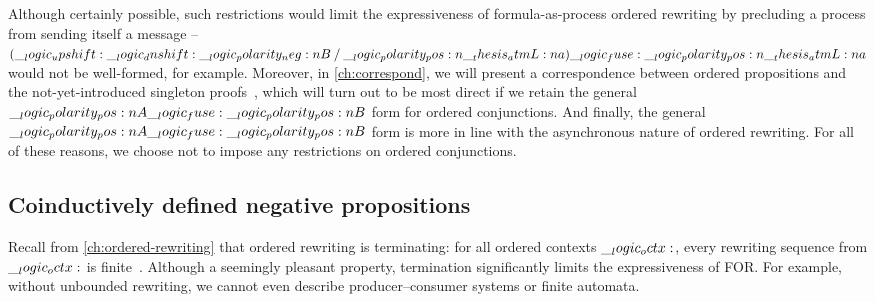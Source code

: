 Although certainly possible, such restrictions would limit the expressiveness of formula-as-process ordered rewriting by precluding a process from sending itself a message -- $(\__logic_upshift: \__logic_dnshift: \__logic_polarity_neg:n {B} \mathbin { / } \__logic_polarity_pos:n {\__thesis_atmL:n {a}}) \__logic_fuse: \__logic_polarity_pos:n {\__thesis_atmL:n {a}}$ would not be well-formed, for example.
Moreover, in \cref{ch:correspond}, we will present a correspondence between ordered propositions and the not-yet-introduced singleton proofs~, which will turn out to be most direct if we retain the general $\__logic_polarity_pos:n {A} \__logic_fuse: \__logic_polarity_pos:n {B}$ form for ordered conjunctions.
And finally, the general $\__logic_polarity_pos:n {A} \__logic_fuse: \__logic_polarity_pos:n {B}$ form is more in line with the asynchronous nature of ordered rewriting.
For all of these reasons, we choose not to impose any restrictions on ordered conjunctions.





\subsection{Coinductively defined negative propositions}\label{sec:formula-as-process:coinductive}

Recall from \cref{ch:ordered-rewriting} that ordered rewriting is terminating: for all ordered contexts $\__logic_octx:$, every rewriting sequence from $\__logic_octx:$ is finite~.
Although a seemingly pleasant property, termination significantly limits the expressiveness of \acl{FOR}.
For example, without unbounded rewriting, we cannot even describe producer--consumer systems or finite automata.

